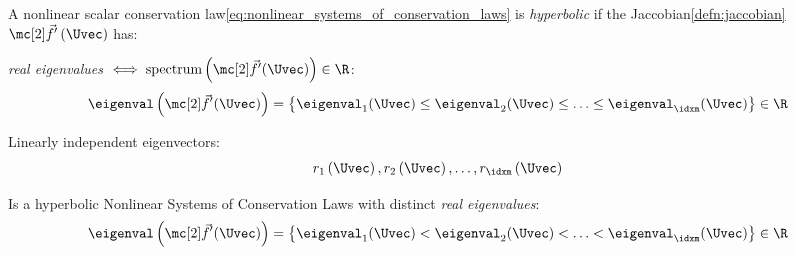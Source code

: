 \begin{defnbox}\nospacing
    \begin{defn}\label{defn:hyperbolic_nonlinear_systems_of_conservation_laws}
        A nonlinear scalar conservation law\cref{eq:nonlinear_systems_of_conservation_laws}
        is \textit{hyperbolic} if the Jaccobian\cref{defn:jaccobian} $\fluxvec'\left(\Uvec\right)$ has:
        \begin{circlelistnosep}
            \item \textit{real eigenvalues} $\iff \text{spectrum}\left(\fluxvec'(\Uvec)\right)\in\R$:
            \begin{align*}
              \eigenval\left(\fluxvec'(\Uvec)\right)
              =\left\{\eigenval_{1}(\Uvec)\leq\eigenval_{2}(\Uvec)\leq\ldots\leq\eigenval_{\idxm}(\Uvec)\right\}\in\R
            \end{align*}
            \item Linearly independent eigenvectors:
            \begin{align}
              r_{1}\left(\Uvec\right),r_{2}\left(\Uvec\right),\ldots,r_{\idxm}\left(\Uvec\right)
            \end{align}
        \end{circlelistnosep}
    \end{defn}
\end{defnbox}
\begin{defnbox}\nospacing
    \begin{defn}\label{defn:strictly_hyperbolic_nonlinear_systems_of_conservation_laws}
        Is a hyperbolic Nonlinear Systems of Conservation Laws with distinct
            \textit{real eigenvalues}:
        \begin{align*}
            \eigenval\left(\fluxvec'(\Uvec)\right)
            =\left\{\eigenval_{1}(\Uvec)<\eigenval_{2}(\Uvec)<\ldots<\eigenval_{\idxm}(\Uvec)\right\}\in\R
        \end{align*}
    \end{defn}
\end{defnbox}
